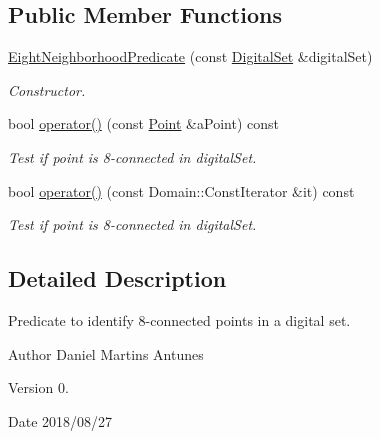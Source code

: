 \subsection*{Public Member Functions}
\begin{DoxyCompactItemize}
\item 
\hyperlink{classDIPaCUS_1_1Neighborhood_1_1EightNeighborhoodPredicate_a7300b6672846f5f7d66d2c4e700c520d}{Eight\+Neighborhood\+Predicate} (const \hyperlink{classDIPaCUS_1_1Neighborhood_1_1EightNeighborhoodPredicate_aa42d6c0cf104dd76dd52278138bdd7a4}{Digital\+Set} \&digital\+Set)
\begin{DoxyCompactList}\small\item\em Constructor. \end{DoxyCompactList}\item 
bool \hyperlink{classDIPaCUS_1_1Neighborhood_1_1EightNeighborhoodPredicate_a4d2b031acfe91d70c961955ce0dcf915}{operator()} (const \hyperlink{classDIPaCUS_1_1Neighborhood_1_1EightNeighborhoodPredicate_af9c9177298acef079066017d8e5b36c8}{Point} \&a\+Point) const
\begin{DoxyCompactList}\small\item\em Test if point is 8-\/connected in digital\+Set. \end{DoxyCompactList}\item 
bool \hyperlink{classDIPaCUS_1_1Neighborhood_1_1EightNeighborhoodPredicate_a5151ba1c950f634d2b99007c39f14c46}{operator()} (const Domain\+::\+Const\+Iterator \&it) const
\begin{DoxyCompactList}\small\item\em Test if point is 8-\/connected in digital\+Set. \end{DoxyCompactList}\end{DoxyCompactItemize}


\subsection{Detailed Description}
Predicate to identify 8-\/connected points in a digital set. 

\begin{DoxyAuthor}{Author}
Daniel Martins Antunes 
\end{DoxyAuthor}
\begin{DoxyVersion}{Version}
0. 
\end{DoxyVersion}
\begin{DoxyDate}{Date}
2018/08/27 
\end{DoxyDate}


